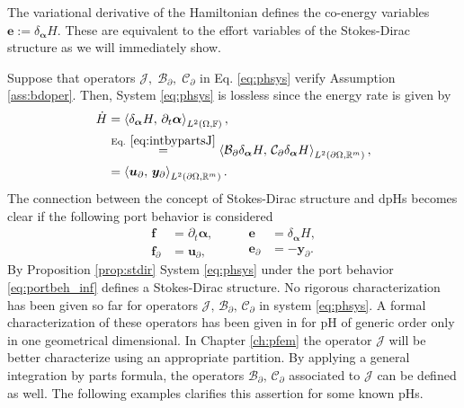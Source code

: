 \begin{remark}
	The variational derivative of the Hamiltonian defines the co-energy variables $\bm{e}:=\delta_{\bm{\alpha}} H$. These are equivalent to the effort variables of the Stokes-Dirac structure as we will immediately show.
\end{remark}

Suppose that operators $\mathcal{J}, \; \mathcal{B}_\partial, \;  \mathcal{C}_\partial$ in Eq. \ref{eq:phsys} verify Assumption \ref{ass:bdoper}. Then, System \eqref{eq:phsys} is lossless since the energy rate is  given by 
\begin{equation}\label{eq:enrate}
\begin{aligned}
\dot{H} &= \inner[L^2(\Omega, \bbF)]{\delta_{\bm{\alpha}} H}{\partial_t \bm{\alpha}}, \\
&\stackrel{\text{Eq. } \eqref{eq:intbypartsJ}}{=} \inner[L^2(\partial\Omega, \bbR^m)]{\mathcal{B}_\partial \delta_{\bm{\alpha}} H}{\mathcal{C}_\partial \delta_{\bm{\alpha}} H}, \\
&= \inner[L^2(\partial\Omega, \bbR^m)]{\bm{u}_\partial}{\bm{y}_\partial}. \
\end{aligned}
\end{equation} 
The connection between the concept of Stokes-Dirac structure and dpHs becomes clear if the following port behavior is considered
\begin{equation}\label{eq:portbeh_inf}
\begin{aligned}
\bm{f} &= \partial_t \bm{\alpha}, \\
\bm{f}_\partial &= \bm{u}_\partial, 
\end{aligned} \qquad
\begin{aligned}
\bm{e} &= \delta_{\bm{\alpha}} H, \\
\bm{e}_\partial &= -\bm{y}_\partial. 
\end{aligned}
\end{equation}
By Proposition \eqref{prop:stdir} System \eqref{eq:phsys} under the port behavior \eqref{eq:portbeh_inf} defines a Stokes-Dirac structure.  
No rigorous characterization has been given so far for operators $\mathcal{J}, \, \mathcal{B_\partial,\, C_\partial}$ in system \eqref{eq:phsys}. A formal characterization of these operators has been given in \cite{legorrec2005} for pH of generic order only in one geometrical dimensional. In Chapter \ref{ch:pfem} the operator $\mathcal{J}$ will be better characterize using an appropriate partition. By applying a general integration by parts formula, the operators $\mathcal{B_\partial,\, C_\partial}$ associated to $\mathcal{J}$ can be defined as well. The following examples clarifies this assertion for some known pHs.


